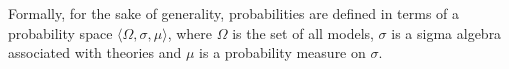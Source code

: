 \documentclass[11pt]{article}
\theoremstyle{definition}
\begin{document}
Formally, for the sake of generality, probabilities are defined in
terms of a probability space $\langle \Omega, \sigma, \mu\rangle$,
where $\Omega$ is the set of all models, $\sigma$ is a sigma algebra
associated with theories and $\mu$ is a probability measure on
$\sigma$.




\end{document}
